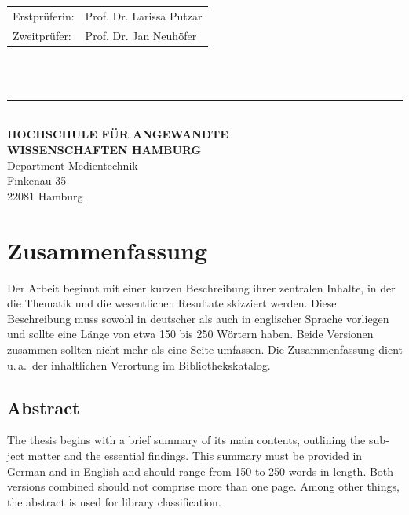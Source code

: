 \begin{titlepage}
  \vspace{3cm}

  \hspace*{37mm}
  \begin{minipage}{0.5\linewidth}
    \begin{tabular}{@{}ll}
      Erstprüferin: & Prof. Dr. Larissa Putzar\\[-.3mm]
      Zweitprüfer: & Prof. Dr. Jan Neuhöfer \\
    \end{tabular}\\
	
    \,\rule{9mm}{1mm}\\[1.5mm]
	
    \textbf{HOCHSCHULE FÜR ANGEWANDTE}\\
    \textbf{WISSENSCHAFTEN HAMBURG}\\
    Department Medientechnik\\
    Finkenau 35\\
    22081 Hamburg
  \end{minipage}
\end{titlepage}
\restoregeometry

\thispagestyle{empty}

\section*{Zusammenfassung}

Der Arbeit beginnt mit einer kurzen Beschreibung ihrer zentralen Inhalte, in
der die Thematik und die wesentlichen Resultate skizziert werden.  Diese
Beschreibung muss sowohl in deutscher als auch in englischer Sprache vorliegen
und sollte eine Länge von etwa 150 bis 250 Wörtern haben.  Beide Versionen
zusammen sollten nicht mehr als eine Seite umfassen.  Die Zusammenfassung
dient u.\,a.\ der inhaltlichen Verortung im Bibliothekskatalog.

{
  \begin{otherlanguage}{english}
    \section*{Abstract}

    The thesis begins with a brief summary of its main contents, outlining the
    subject matter and the essential findings.  This summary must be provided
    in German and in English and should range from 150 to 250 words in length.
    Both versions combined should not comprise more than one page.  Among
    other things, the abstract is used for library classification.
  \end{otherlanguage}
}
